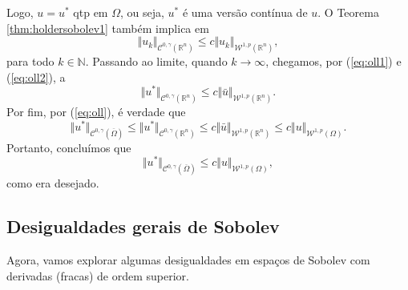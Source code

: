 \documentclass[a4paper, 11pt]{book}
\theoremstyle{definition}
\newcommand{\bN}{\mathbb{N}}
\newcommand{\bR}{\mathbb{R}}
\newcommand{\cC}{\mathcal{C}}
\newcommand{\cW}{\mathcal{W}}
\begin{document}
\begin{prf}
    Logo, $u = u^*$ qtp em $\Omega$, ou seja, $u^*$ é uma versão contínua de $u$.
    O Teorema \ref{thm:holdersobolev1} também implica em
    \[
        \Vert u_k \Vert_{\cC^{0,\gamma}(\bR^n)} \leqslant c \Vert u_k \Vert_{\cW^{1,p}(\bR^n)},
    \]
    para todo $k \in \bN$.
    Passando ao limite, quando $k \to \infty$, chegamos, por (\ref{eq:oll1}) e (\ref{eq:oll2}), a
    \[
        \Vert u^* \Vert_{\cC^{0,\gamma}(\bR^n)} \leqslant c \Vert \bar u \Vert_{\cW^{1,p}(\bR^n)}.
    \]
    Por fim, por (\ref{eq:oll}), é verdade que
    \[
        \Vert u^* \Vert_{\cC^{0,\gamma}(\overline \Omega)} \leqslant \Vert u^* \Vert_{\cC^{0,\gamma}(\bR^n)} \leqslant c \Vert \bar u \Vert_{\cW^{1,p}(\bR^n)} \leqslant c \Vert u \Vert_{\cW^{1,p}(\Omega)}.
    \]
    Portanto, concluímos que
    \[
        \Vert u^* \Vert_{\cC^{0,\gamma}(\overline\Omega)} \leqslant c \Vert u \Vert_{\cW^{1,p}(\Omega)},
    \]
    como era desejado.
\end{prf}

\subsection{Desigualdades gerais de Sobolev}

Agora, vamos explorar algumas desigualdades em espaços de Sobolev com derivadas (fracas) de ordem superior.
\end{document}
